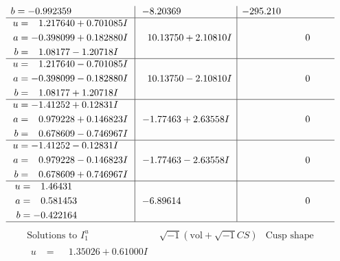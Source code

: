 \documentclass[1p]{elsarticle_modified}
\theoremstyle{definition}
\newcommand{\I}{\sqrt{-1}}
\begin{document}
$$\begin{array}{c|c|c}
\begin{aligned}
b &= -0.992359\phantom{ +0.000000I}\end{aligned}
 & -8.20369\phantom{ +0.000000I} & -295.210\phantom{ +0.000000I} \\ \hline\begin{aligned}
u &= \phantom{-}1.217640 + 0.701085 I \\
a &= -0.398099 + 0.182880 I \\
b &= \phantom{-}1.08177 - 1.20718 I\end{aligned}
 & \phantom{-}10.13750 + 2.10810 I & \phantom{-0.000000 } 0 \\ \hline\begin{aligned}
u &= \phantom{-}1.217640 - 0.701085 I \\
a &= -0.398099 - 0.182880 I \\
b &= \phantom{-}1.08177 + 1.20718 I\end{aligned}
 & \phantom{-}10.13750 - 2.10810 I & \phantom{-0.000000 } 0 \\ \hline\begin{aligned}
u &= -1.41252 + 0.12831 I \\
a &= \phantom{-}0.979228 + 0.146823 I \\
b &= \phantom{-}0.678609 - 0.746967 I\end{aligned}
 & -1.77463 + 2.63558 I & \phantom{-0.000000 } 0 \\ \hline\begin{aligned}
u &= -1.41252 - 0.12831 I \\
a &= \phantom{-}0.979228 - 0.146823 I \\
b &= \phantom{-}0.678609 + 0.746967 I\end{aligned}
 & -1.77463 - 2.63558 I & \phantom{-0.000000 } 0 \\ \hline\begin{aligned}
u &= \phantom{-}1.46431\phantom{ +0.000000I} \\
a &= \phantom{-}0.581453\phantom{ +0.000000I} \\
b &= -0.422164\phantom{ +0.000000I}\end{aligned}
 & -6.89614\phantom{ +0.000000I} & \phantom{-0.000000 } 0\\
 \hline 
 \end{array}$$\newpage$$\begin{array}{c|c|c}  
\text{Solutions to }I^u_{1}& \I (\text{vol} + \sqrt{-1}CS) & \text{Cusp shape}\\
 \hline 
\begin{aligned}
u &= \phantom{-}1.35026 + 0.61000 I \\

\end{aligned}
\end{array}$$
\end{document}
